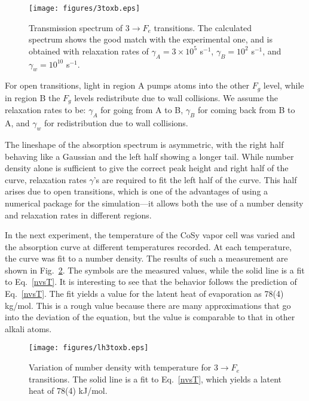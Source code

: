 	\begin{figure}
	\centering
	\texttt{[image: figures/3toxb.eps]}
	\caption{Transmission spectrum of $ 3 \rightarrow F_e $ transitions. The calculated spectrum shows the good match with the experimental one, and is obtained with relaxation rates of  $ \gamma_A = 3 \times 10^5 $ s$^{-1}$, $ \gamma_B = 10^2 $ s$^{-1}$, and $ \gamma_w = 10^{10} $ s$^{-1}$.}
	\label{3tox}
	\end{figure}
	
	For open transitions, light in region A pumps atoms into the other $ F_g $ level, while in region B the $ F_g $ levels redistribute due to wall collisions. We assume the relaxation rates to be: $ \gamma_A $ for going from A to B, $ \gamma_B $ for coming back from B to A, and $ \gamma_w $ for redistribution due to wall collisions.
	
	The lineshape of the absorption spectrum  is asymmetric, with the right half behaving like a Gaussian and the left half showing a longer tail. While number density alone is sufficient to give the correct peak height and right half of the curve, relaxation rates $\gamma $'s are required to fit the left half of the curve. This half arises due to open transitions, which is one of the advantages of using a numerical package for the simulation---it allows both the use of a number density and relaxation rates in different regions.
	
	In the next experiment, the temperature of the CoSy vapor cell was varied and the absorption curve at different temperatures recorded. At each temperature, the curve was fit to a number density. The results of such a measurement are shown in Fig.~\ref{lh3tox}. The symbols are the measured values, while the solid line is a fit to Eq.~\eqref{nvsT}. It is interesting to see that the behavior follows the prediction of Eq.~\eqref{nvsT}. The fit yields a value for the latent heat of evaporation as 78(4) kg/mol. This is a rough value because there are many approximations that go into the deviation of the equation, but the value is comparable to that in other alkali atoms.
	
	\begin{figure}
		\centering
		\texttt{[image: figures/lh3toxb.eps]}
		\caption{ Variation of number density with temperature for $ 3 \rightarrow F_e $ transitions. The solid line is a fit to Eq.~\eqref{nvsT}, which yields a latent heat of 78(4) kJ/mol.}
		\label{lh3tox}
	\end{figure}
	
